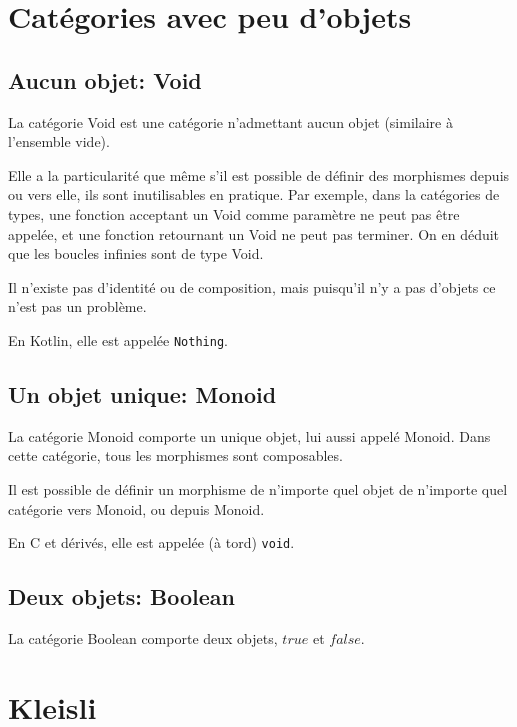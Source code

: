 \documentclass[a4paper,10pt,french,openany]{memoir}
\begin{document}
\section{Catégories avec peu d'objets}

\subsection{Aucun objet: Void}
La catégorie Void est une catégorie n'admettant aucun objet (similaire à l'ensemble vide).

Elle a la particularité que même s'il est possible de définir des morphismes depuis ou vers elle, ils sont inutilisables en pratique. Par exemple, dans la catégories de types, une fonction acceptant un Void comme paramètre ne peut pas être appelée, et une fonction retournant un Void ne peut pas terminer. On en déduit que les boucles infinies sont de type Void.

Il n'existe pas d'identité ou de composition, mais puisqu'il n'y a pas d'objets ce n'est pas un problème.

En Kotlin, elle est appelée \lstinline{Nothing}.

\subsection{Un objet unique: Monoid}
La catégorie Monoid comporte un unique objet, lui aussi appelé Monoid. Dans cette catégorie, tous les morphismes sont composables.

Il est possible de définir un morphisme de n'importe quel objet de n'importe quel catégorie vers Monoid, ou depuis Monoid.

En C et dérivés, elle est appelée (à tord) \lstinline{void}.

\subsection{Deux objets: Boolean}
La catégorie Boolean comporte deux objets, $true$ et $false$.

\section{Kleisli}

\printindex
\end{document}
